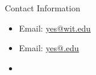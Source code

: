 \documentclass[final]{beamer}
\newlength{\onecolwid}
\begin{document}
\begin{frame}[t]
\begin{columns}[t]
\begin{column}{\onecolwid}
\begin{alertblock}{Contact Information}

\begin{itemize}
\item Email: \href{mailto:YES@wit.edu}{yes@wit.edu}
\item Email: \href{mailto:YES@wit.edu}{yes@.edu}
\item
\end{itemize}

\end{alertblock}




\end{column} %

\end{columns} %

\end{frame} %
\end{document}
